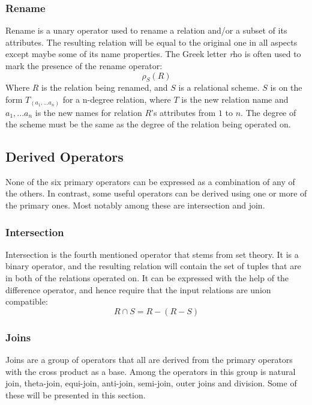 \subsubsection{Rename}
\label{sect:theory:relAlg:rename}
Rename is a unary operator used to rename a relation and/or a subset of its attributes. The resulting relation
will be equal to the original one in all aspects except maybe some of its name properties. The Greek letter
\emph{r}ho is often used to mark the presence of the rename operator:
\begin{equation*}
\rho _{S}(R)
\end{equation*}
Where $R$ is the relation being renamed, and $S$ is a relational scheme. $S$ is on the form $T _{(a _{1},...a
_{n})}$ for a n-degree relation, where $T$ is the new relation name and $a _{1},...a _{n}$ is the new names for
relation $R$'s attributes from $1$ to $n$. The degree of the scheme must be the same as the degree of the relation
being operated on.

\subsection{Derived Operators}
\label{sect:theory:relAlg:derivedOper}
None of the six primary operators can be expressed as a combination of any of the others. In contrast, some useful
operators can be derived using one or more of the primary ones. Most notably among these are intersection and join.

\subsubsection{Intersection}
\label{sect:theory:relAlg:intersection}
Intersection is the fourth mentioned operator that stems from set theory. It is a binary operator, and the
resulting relation will contain the set of tuples that are in both of the relations operated on. It can be
expressed with the help of the difference operator, and hence require that the input relations are union compatible:
\begin{equation*}
R \cap S = R-(R-S)
\end{equation*}

\subsubsection{Joins}
\label{sect:theory:relAlg:joins}
Joins are a group of operators that all are derived from the primary operators with the cross product as a base.
Among the operators in this group is natural join, theta-join, equi-join, anti-join, semi-join, outer joins and
division. Some of these will be presented in this section.

